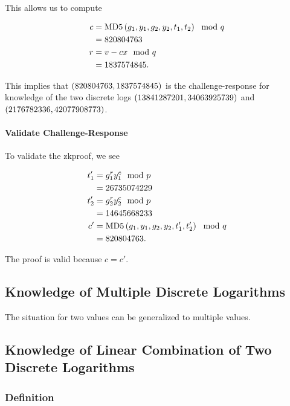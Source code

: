 \begin{example}
\noindent
This allows us to compute

\begin{align}
    c &= \text{MD5{}}\left( g_{1},y_{1},g_{2},y_{2},t_{1},t_{2} \right) \mod q
            \nonumber\\
        &= 820804763 \nonumber\\
    r &= v - cx \mod q \nonumber\\
        &= 1837574845.
\end{align}

\noindent
This implies that $\left( 820804763,1837574845 \right)$
is the challenge-response for knowledge of the two \glspl{discrete log}
$\left( 13841287201,34063925739 \right)$ and $\left( 2176782336,42077908773 \right)$.

\paragraph{Validate Challenge-Response}
To validate the \gls{zkproof}, we see

\begin{align}
    t_{1}' &= g_{1}^{r}y_{1}^{c} \mod p \nonumber\\
        &= 26735074229 \nonumber\\
    t_{2}' &= g_{2}^{r}y_{2}^{c} \mod p \nonumber\\
        &= 14645668233 \nonumber\\
    c' &= \text{MD5{}}\left( g_{1},y_{1},g_{2},y_{2},t_{1}',t_{2}' \right) \mod q
            \nonumber\\
        &= 820804763.
\end{align}

\noindent
The proof is valid because $c=c'$.


\end{example}


\subsection{Knowledge of Multiple Discrete Logarithms}

The situation for two values can be generalized to multiple values.

\subsection{Knowledge of Linear Combination of Two Discrete Logarithms}

\subsubsection{Definition}

